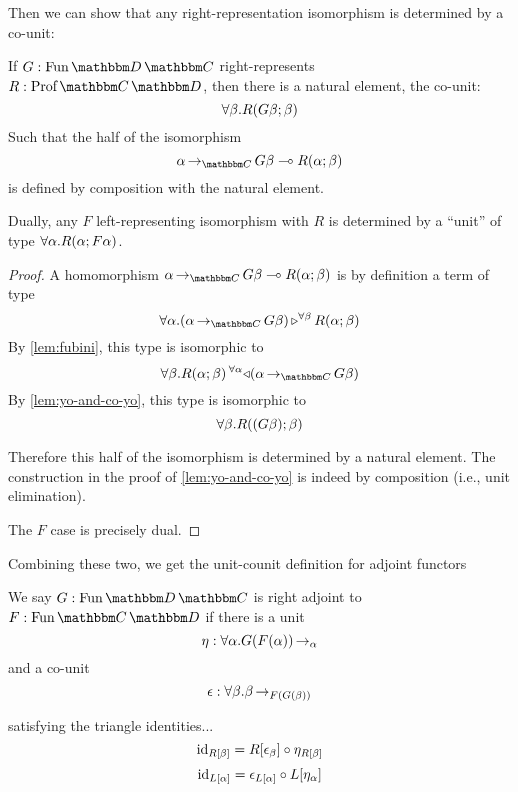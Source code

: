 \documentclass{llncs}
\begin{document}
Then we can show that any right-representation isomorphism is
determined by a co-unit:
\begin{lemma}
  If $G: \varr {\cat D}{\cat C}$ right-represents $R : \harr {\cat
    C}{\cat D}$, then there is a natural element, the co-unit:
  \[ \forall \beta. R(G\beta;\beta) \]
  Such that the half of the isomorphism 
  \[ \punitinXfromYtoZ {\cat C} {\alpha} {G \beta} \multimap \harrapp R {\alpha}{\beta} \]
  is defined by composition with the natural element.

  Dually, any $F$ left-representing isomorphism with $R$ is determined
  by a ``unit'' of type $\forall \alpha. R(\alpha;F\alpha)$.
\end{lemma}
\begin{proof}
  A homomorphism $\punitinXfromYtoZ {\cat C} {\alpha} {G \beta} \multimap \harrapp R {\alpha}{\beta}$ is by definition a term of type
  \[ \pendallXdotY \alpha \homrallXYtoZ {\beta} {(\punitinXfromYtoZ {\cat C} \alpha {G \beta})} {\harrapp R \alpha \beta} \]
  By \cref{lem:fubini}, this type is isomorphic to 
  \[ \pendallXdotY \beta \homlallXYtoZ {\alpha} {(\punitinXfromYtoZ {\cat C} \alpha {G \beta})} {\harrapp R \alpha \beta} \]
  By \cref{lem:yo-and-co-yo}, this type is isomorphic to
  \[ \forall \beta. {R((G \beta);\beta)} \]

  Therefore this half of the isomorphism is determined by a natural
  element. The construction in the proof of \cref{lem:yo-and-co-yo} is
  indeed by composition (i.e., unit elimination).

  The $F$ case is precisely dual.
\end{proof}

Combining these two, we get the unit-counit definition for adjoint
functors

\begin{definition}
  We say $G : \varr {\cat D}{\cat C}$ is right adjoint to $F : \varr
  {\cat C}{\cat D}$ if there is a unit
  \[ \eta : \forall \alpha. G(F(\alpha)) \mathop{\to_{\alpha}} \]
  and a co-unit
  \[ \epsilon : \forall \beta. \beta \mathop{\to_{F(G(\beta))}} \]

  satisfying the triangle identities...
  \[ \textrm{id}_{R[\beta]} = R[\epsilon_{\beta}] \circ \eta_{R[\beta]} \]
  \[ \textrm{id}_{L[\alpha]} = \epsilon_{L[\alpha]} \circ L[\eta_{\alpha}] \]
\end{definition}
\end{document}
